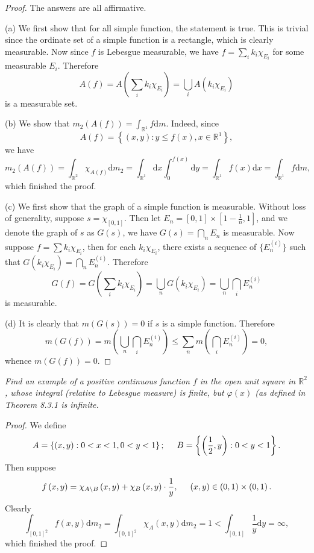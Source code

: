 \begin{proof}
The answers are all affirmative.\par
(a) We first show that for all simple function, the statement is true. This is trivial since the ordinate set of a simple function is a rectangle, which is clearly measurable. Now since $f$ is Lebesgue measurable, we have $f=\sum_ik_i\chi_{E_i}$ for some measurable $E_i$. Therefore 
$$
A\left( f \right) =A\left( \sum_i{k_i\chi _{E_i}} \right) =\bigcup_i{A\left( k_i\chi _{E_i} \right)}
$$
is a measurable set.\par
(b) We show that $m_2(A(f))=\int_{\mathbb{R}^1}f\mathrm{d}m$. Indeed, since 
$$
A\left( f \right) =\left\{ \left( x,y \right) :y\le f\left( x \right) ,x\in \mathbb{R} ^1 \right\} ,
$$
we have 
$$
m_2\left( A\left( f \right) \right) =\int_{\mathbb{R} ^2}{\chi _{A\left( f \right)}\mathrm{d}m_2}=\int_{\mathbb{R} ^1}{\mathrm{d}x\int_0^{f\left( x \right)}{\mathrm{d}y}}=\int_{\mathbb{R} ^1}{f\left( x \right) \mathrm{d}x}=\int_{\mathbb{R} ^1}{f\mathrm{d}m},
$$
which finished the proof.\par
(c) We first show that the graph of a simple function is measurable. Without loss of generality, suppose $s=\chi_{[0,1]}$. Then let $E_n=[0,1]\times\left[1-\frac{1}{n},1\right]$, and we denote the graph of $s$ as $G(s)$, we have $G(s)=\bigcap_nE_n$ is measurable. Now suppose $f=\sum k_i\chi_{E_i}$, then for each $k_i\chi_{E_i}$, there exists a sequence of $\{E_n^{(i)}\}$ such that $G(k_i\chi_{E_i})=\bigcap_nE_n^{(i)}$. Therefore 
$$
G\left( f \right) =G\left( \sum_i{k_i\chi _{E_i}} \right) =\bigcup_n{G\left( k_i\chi _{E_i} \right)}=\bigcup_n{\bigcap_i{E_{n}^{\left( i \right)}}}
$$
is measurable.\par
(d) It is clearly that $m(G(s))=0$ if $s$ is a simple function. Therefore 
$$
m\left( G\left( f \right) \right) =m\left( \bigcup_n{\bigcap_i{E_{n}^{\left( i \right)}}} \right) \le \sum_n{m\left( \bigcap_i{E_{n}^{\left( i \right)}} \right)}=0,
$$
whence $m(G(f))=0$.
\end{proof}
\begin{problem}\em
Find an example of a positive continuous function $f$ in the open unit square in $\mathbb{R}^2$, whose integral (relative to Lebesgue measure) is finite, but $\varphi(x)$ (as defined in Theorem 8.3.1 is infinite.
\end{problem}
\begin{proof}
We define 
$$
A=\left\{ \left( x,y \right) :0<x<1,0<y<1 \right\} ;\hspace{0.5cm}B=\left\{ \left( \frac{1}{2},y \right) :0<y<1 \right\} .
$$
Then suppose 
$$
f\left( x,y \right) =\chi _{A\setminus B}\left( x,y \right) +\chi _B\left( x,y \right) \cdot \frac{1}{y},\hspace{0.5cm}\left( x,y \right) \in \left( 0,1 \right) \times \left( 0,1 \right) .
$$
Clearly 
$$
\int_{\left[ 0,1 \right] ^2}{f\left( x,y \right) \mathrm{d}m_2}=\int_{\left[ 0,1 \right] ^2}{\chi _A\left( x,y \right) \mathrm{d}m_2}=1<\int_{\left[ 0,1 \right]}{\frac{1}{y}\mathrm{d}y}=\infty ,
$$
which finished the proof.
\end{proof}
